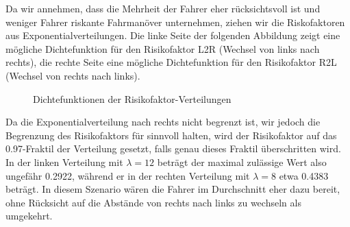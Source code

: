 \documentclass[10pt, a4paper]{article}
\begin{document}
Da wir annehmen, dass die Mehrheit der Fahrer eher rücksichtsvoll ist und weniger Fahrer riskante Fahrmanöver unternehmen, ziehen wir die Riskofaktoren aus Exponentialverteilungen. Die linke Seite der folgenden Abbildung zeigt eine mögliche Dichtefunktion für den Risikofaktor L2R (Wechsel von links nach rechts), die rechte Seite eine mögliche Dichtefunktion für den Risikofaktor R2L (Wechsel von rechts nach links).

\begin{figure}[h!]
    \centering
    \caption{Dichtefunktionen der Risikofaktor-Verteilungen}
    \label{fig:riskFactorDistributions}
\end{figure}

Da die Exponentialverteilung nach rechts nicht begrenzt ist, wir jedoch die Begrenzung des Risikofaktors für sinnvoll halten, wird der Risikofaktor auf das 0.97-Fraktil der Verteilung gesetzt, falls genau dieses Fraktil überschritten wird. In der linken Verteilung mit $\lambda = 12$ beträgt der maximal zulässige Wert also ungefähr 0.2922, während er in der rechten Verteilung mit $\lambda = 8$ etwa 0.4383 beträgt. In diesem Szenario wären die Fahrer im Durchschnitt eher dazu bereit, ohne Rücksicht auf die Abstände von rechts nach links zu wechseln als umgekehrt.
\end{document}
